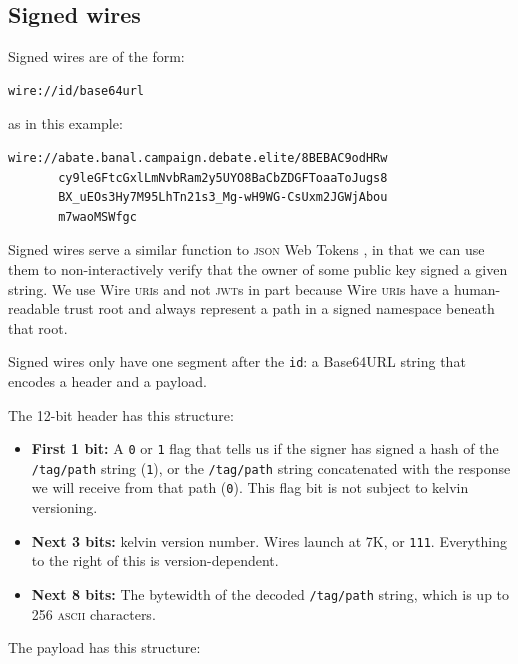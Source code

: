 \documentclass[twoside]{article}
\begin{document}
\subsection{Signed wires}\label{signed-wires}

Signed wires are of the form:

\begin{lstlisting}[style=listingcode]
wire://id/base64url
\end{lstlisting}

\noindent
as in this example:

\begin{lstlisting}[style=listingcode]
wire://abate.banal.campaign.debate.elite/8BEBAC9odHRw
       cy9leGFtcGxlLmNvbRam2y5UYO8BaCbZDGFToaaToJugs8
       BX_uEOs3Hy7M95LhTn21s3_Mg-wH9WG-CsUxm2JGWjAbou
       m7waoMSWfgc
\end{lstlisting}

Signed wires serve a similar function to \textsc{json} Web Tokens \citep{RFC7519}, in that we can
use them to non-interactively verify that the owner of some public key
signed a given string. We use Wire \textsc{uri}s and not \textsc{jwt}s in part because
Wire \textsc{uri}s have a human-readable trust root and always represent a path
in a signed namespace beneath that root.

Signed wires only have one segment after the \texttt{id}: a Base64URL
string that encodes a header and a payload.

The 12-bit header has this structure:

\begin{itemize}[noitemsep,topsep=2pt]

\item
  \textbf{First 1 bit:} A \texttt{0} or \texttt{1} flag that tells us if
  the signer has signed a hash of the \texttt{/tag/path} string
  (\texttt{1}), or the \texttt{/tag/path} string concatenated with the
  response we will receive from that path (\texttt{0}). This flag bit is
  not subject to kelvin versioning.
\item
  \textbf{Next 3 bits:} kelvin version number. Wires launch at 7K, or
  \texttt{111}. Everything to the right of this is version-dependent.
\item
  \textbf{Next 8 bits:} The bytewidth of the decoded \texttt{/tag/path}
  string, which is up to 256 \textsc{ascii} characters.
\end{itemize}

The payload has this structure:
\end{document}
